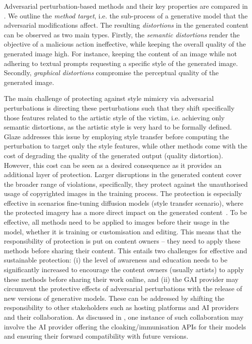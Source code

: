 \documentclass[conference,table]{IEEEtran}
\begin{document}


Adversarial perturbation-based methods and their key properties are compared in . 
We outline the \textit{method target}, i.e. the sub-process of a generative model that the adversarial modifications affect.
The resulting \textit{distortions} in the generated content can be observed as two main types. 
Firstly, the \textit{semantic distortions} render the objective of a malicious action ineffective, while keeping the overall quality of the generated image high. 
For instance, keeping the content of an image while not adhering to textual prompts requesting a specific style of the generated image. 
Secondly, \textit{graphical distortions} compromise the perceptual quality of the generated image. 

The main challenge of protecting against style mimicry via adversarial perturbations is directing these perturbations such that they shift specifically those features related to the artistic style of the victim, i.e. achieving only semantic distortions, as the artistic style is very hard to be formally defined. 
Glaze addresses this issue by employing style transfer before computing the perturbation to target only the style features, while other methods come with the cost of degrading the quality of the generated output (quality distortion).
However, this cost can be seen as a desired consequence as it provides an additional layer of protection. 
Larger disruptions in the generated content cover the broader range of violations, specifically, they protect against the unauthorised usage of copyrighted images in the training process. 
The protection is especially effective in scenarios fine-tuning diffusion models (style transfer scenario), where the protected imagery has a more direct impact on the generated content~\cite{liang_mist_2023}.
To be effective, all methods need to be applied to images before their usage in the model, whether it is training or customisation and editing. 
This means that the responsibility of protection is put on content owners -- they need to apply these methods before sharing their content.
This entails two challenges for effective and sustainable protection: (i) the level of awareness and education needs to be significantly increased to encourage the content owners (usually artists) to apply these methods before sharing their work online, and (ii) the GAI provider may circumvent the protective effects of adversarial perturbations with the release of new versions of generative models. 
These can be addressed by shifting the responsibility to other stakeholders such as hosting platforms and AI providers and their collaboration. 
As discussed in \cite{salman_raising_2023}, one instance of such collaboration may involve the AI provider offering the cloaking/immunisation APIs for their models and ensuring their forward compatibility with future versions.
\end{document}
